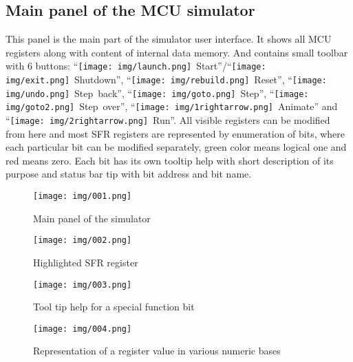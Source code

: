 \documentclass[a4paper,twoside,12pt]{book}
\begin{document}
		\subsection{Main panel of the MCU simulator}
			This panel is the main part of the simulator user interface. It shows all MCU registers along with content of internal data memory. And contains small toolbar with 6 buttons: ``\texttt{[image: img/launch.png]}~Start''/``\texttt{[image: img/exit.png]}~Shutdown'', ``\texttt{[image: img/rebuild.png]}~Reset'', ``\texttt{[image: img/undo.png]}~Step~back'', ``\texttt{[image: img/goto.png]}~Step'', ``\texttt{[image: img/goto2.png]}~Step~over'', ``\texttt{[image: img/1rightarrow.png]}~Animate'' and ``\texttt{[image: img/2rightarrow.png]}~Run''. All visible registers can be modified from here and most SFR registers are represented by enumeration of bits, where each particular bit can be modified separately, green color means logical one and red means zero. Each bit has its own tooltip help with short description of its purpose and status bar tip with bit address and bit name.
			\begin{figure}[h!]
				\centering{}
				\caption{Main panel of the simulator}
				\texttt{[image: img/001.png]}
			\end{figure}
			\begin{figure}[h!]
				\begin{minipage}[b]{.3\textwidth}
					\centering{}
					\texttt{[image: img/002.png]}
					\caption{Highlighted SFR register}
				\end{minipage}
				\begin{minipage}[b]{.3\textwidth}
					\centering{}
					\texttt{[image: img/003.png]}
					\caption{Tool tip help for a special function bit}
				\end{minipage}
				\begin{minipage}[b]{.3\textwidth}
					\centering{}
					\texttt{[image: img/004.png]}
					\caption{Representation of a register value in various numeric bases}
				\end{minipage}
			\end{figure}
\end{document}
